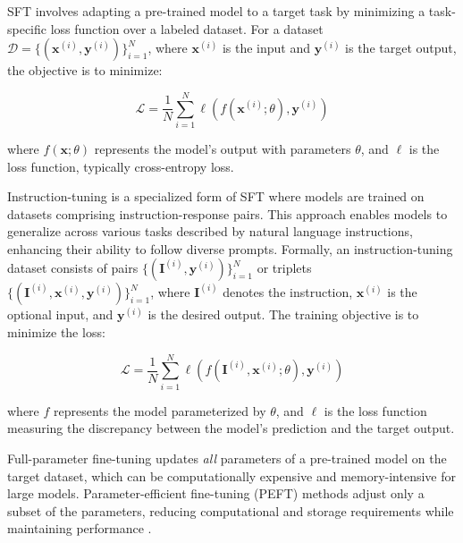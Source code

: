 SFT involves adapting a pre-trained model to a target task by minimizing a task-specific loss function over a labeled dataset. For a dataset \( \mathcal{D} = \{(\mathbf{x}^{(i)}, \mathbf{y}^{(i)})\}_{i=1}^N \), where \( \mathbf{x}^{(i)} \) is the input and \( \mathbf{y}^{(i)} \) is the target output, the objective is to minimize:

\begin{equation}
\mathcal{L} = \frac{1}{N} \sum_{i=1}^N \ell(f(\mathbf{x}^{(i)}; \theta), \mathbf{y}^{(i)})
\end{equation}

where \( f(\mathbf{x}; \theta) \) represents the model's output with parameters \( \theta \), and \( \ell \) is the loss function, typically cross-entropy loss.

 \label{app:instruction-tuning-it}

Instruction-tuning is a specialized form of SFT  where models are trained on datasets comprising instruction-response pairs. This approach enables models to generalize across various tasks described by natural language instructions, enhancing their ability to follow diverse prompts. Formally, an instruction-tuning dataset consists of pairs \( \{(\mathbf{I}^{(i)}, \mathbf{y}^{(i)})\}_{i=1}^N \) or triplets \( \{(\mathbf{I}^{(i)}, \mathbf{x}^{(i)}, \mathbf{y}^{(i)})\}_{i=1}^N \), where \( \mathbf{I}^{(i)} \) denotes the instruction, \( \mathbf{x}^{(i)} \) is the optional input, and \( \mathbf{y}^{(i)} \) is the desired output. The training objective is to minimize the loss:

\begin{equation}
\mathcal{L} = \frac{1}{N} \sum_{i=1}^N \ell(f(\mathbf{I}^{(i)}, \mathbf{x}^{(i)}; \theta), \mathbf{y}^{(i)})
\end{equation}

where \( f \) represents the model parameterized by \( \theta \), and \( \ell \) is the loss function measuring the discrepancy between the model's prediction and the target output.

 \label{app:peft}
Full-parameter fine-tuning updates \textit{all} parameters of a pre-trained model on the target dataset, which can be computationally expensive and memory-intensive for large models. Parameter-efficient fine-tuning (PEFT) methods adjust only a subset of the parameters, reducing computational and storage requirements while maintaining performance \citep{XuPARAMETEREFFICIENT2023}.

